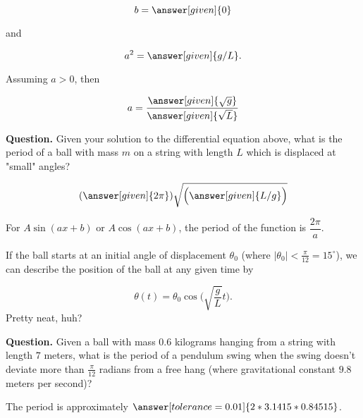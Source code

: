 \documentclass[handout,nooutcomes]{ximera}
\begin{document}
\begin{example}
\begin{explanation}
\begin{question}
\[
b = \answer[given]{0}
\]

and 

\[
a^2 = \answer[given]{g/L}.
\]

Assuming $a>0$, then 

\[
a = \dfrac{\answer[given]{\sqrt{g}}}{\answer[given]{\sqrt{L}}}
\]
\end{question}

\textbf{Question.}  Given your solution to the differential equation above, what is the period of a ball with mass $m$ on a string with length $L$ which is displaced at "small" angles?

\[
(\answer[given]{2\pi})\sqrt{\Big(\answer[given]{L/g}\Big)}
\]
\begin{expandable}
For $A\sin(ax+b)$ or $A\cos(ax+b)$, the period of the function is $\dfrac{2\pi}{a}$.
\end{expandable}

If the ball starts at an initial angle of displacement $\theta_0$
(where $|\theta_0|<\frac{\pi}{12}= 15^\circ$), we can describe
the position of the ball at any given time by

\[
\theta(t) = \theta_0 \cos\Big(\sqrt{\frac{g}{L}} t\Big).
\]
Pretty neat, huh?


\textbf{Question. }  Given a ball with mass $0.6$ kilograms hanging from a string with length $7$ meters, what is the period of a pendulum swing when the swing doesn't deviate more than $\frac{\pi}{12}$ radians from a free hang (where gravitational constant $9.8$ meters per second)?


The period is approximately $\answer[tolerance=0.01]{2*3.1415*0.84515}$.


\end{explanation}
\end{example}



\end{document}
